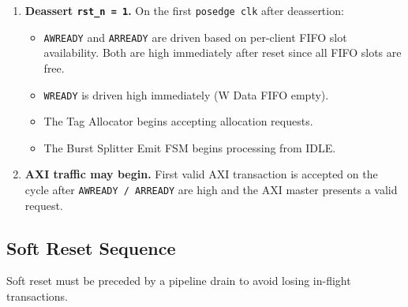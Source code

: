\documentclass[11pt,a4paper]{article}
\begin{document}
\begin{enumerate}
  \item \textbf{Deassert \texttt{rst\_n = 1}.}
        On the first \texttt{posedge clk} after deassertion:
        \begin{itemize}
          \item \texttt{AWREADY} and \texttt{ARREADY} are driven based on
                per-client FIFO slot availability. Both are high immediately
                after reset since all FIFO slots are free.
          \item \texttt{WREADY} is driven high immediately (W Data FIFO empty).
          \item The Tag Allocator begins accepting allocation requests.
          \item The Burst Splitter Emit FSM begins processing from
                \textsc{IDLE}.
        \end{itemize}

  \item \textbf{AXI traffic may begin.}
        First valid AXI transaction is accepted on the cycle after
        \texttt{AWREADY / ARREADY} are high and the AXI master presents a
        valid request.
\end{enumerate}

\subsection{Soft Reset Sequence}

Soft reset must be preceded by a pipeline drain to avoid losing in-flight
transactions.
\end{document}
